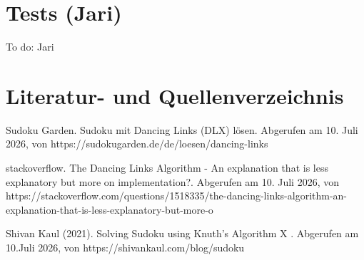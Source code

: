 \documentclass[a4paper,10pt]{article}
\begin{document}
\section{Tests (Jari)}
To do: Jari



\section*{Literatur- und Quellenverzeichnis}

\begin{description}
    \item Sudoku Garden. Sudoku mit Dancing Links (DLX) lösen. Abgerufen am 10. Juli 2026, von https://sudokugarden.de/de/loesen/dancing-links
    \item stackoverflow. The Dancing Links Algorithm - An explanation that is less explanatory but more on implementation?. Abgerufen am 10. Juli 2026, von https://stackoverflow.com/questions/1518335/the-dancing-links-algorithm-an-explanation-that-is-less-explanatory-but-more-o 
    \item Shivan Kaul (2021). Solving Sudoku using Knuth's Algorithm X . Abgerufen am 10.Juli 2026, von https://shivankaul.com/blog/sudoku 
\end{description}
\end{document}
